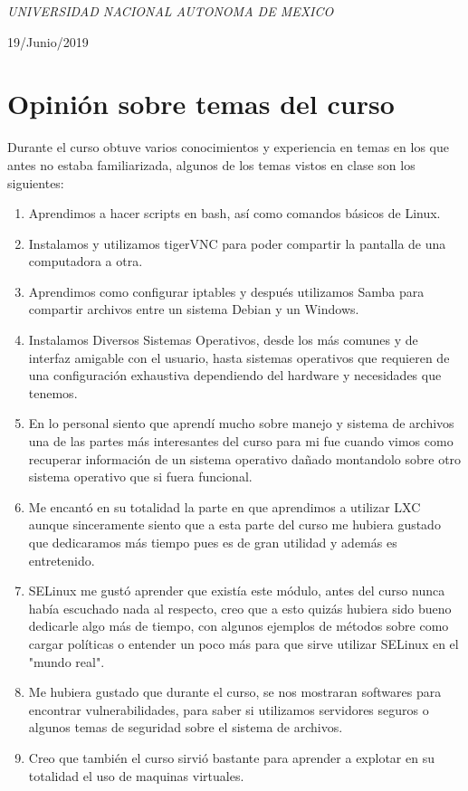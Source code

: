 \documentclass[a4paper, 11pt, oneside]{article}
\begin{document}
\begin{titlepage}
	\textit{UNIVERSIDAD NACIONAL AUTONOMA DE MEXICO} 
	
	\vfill
	
	
	
	
	\vspace{0.3\baselineskip} 
	
	19/Junio/2019 
	
	 

\end{titlepage}
\section*{Opinión sobre temas del curso}
Durante el curso obtuve varios conocimientos y experiencia en temas en los que antes no estaba familiarizada, algunos de los temas vistos en clase son los siguientes:
\begin{enumerate}
    \item Aprendimos a hacer scripts en bash, así como comandos básicos de Linux.
    \item Instalamos y utilizamos tigerVNC para poder compartir la pantalla de una computadora a otra.
    \item Aprendimos como configurar iptables y después utilizamos Samba para compartir archivos entre un sistema Debian y un Windows.
    \item Instalamos Diversos Sistemas Operativos, desde los más comunes y de interfaz amigable con el usuario, hasta sistemas operativos que requieren de una configuración exhaustiva dependiendo del hardware y necesidades que tenemos.
    \item En lo personal siento que aprendí mucho sobre manejo y sistema de archivos una de las partes más interesantes del curso para mi fue cuando vimos como recuperar información de un sistema operativo dañado montandolo sobre otro sistema operativo que si fuera funcional.
    \item Me encantó en su totalidad la parte en que aprendimos a utilizar LXC aunque sinceramente siento que a esta parte del curso me hubiera gustado que dedicaramos más tiempo pues es de gran utilidad y además es entretenido.
    \item SELinux me gustó aprender que existía este módulo, antes del curso nunca había escuchado nada al respecto, creo que a esto quizás hubiera sido bueno dedicarle algo más de tiempo, con algunos ejemplos de métodos sobre como cargar políticas o entender un poco más para que sirve utilizar SELinux en el "mundo real".
    \item Me hubiera gustado que durante el curso, se nos mostraran softwares para encontrar vulnerabilidades, para saber si utilizamos servidores seguros o algunos temas de seguridad sobre el sistema de archivos.
    \item Creo que también el curso sirvió bastante para aprender a explotar en su totalidad el uso de maquinas virtuales.
\end{enumerate}
\end{document}

